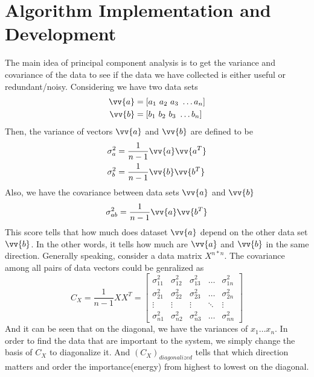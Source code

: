 \documentclass[twoside,twocolumn]{article}
\begin{document}
    \section{Algorithm Implementation and Development}
    The main idea of principal component analysis is to get the variance and covariance of the data to see if
    the data we have collected is either useful or redundant/noisy.
    Considering we have two data sets 
    \begin{align*}
        \vv{a} &= [a_1\ a_2\ a_3\ \dots a_n] \\
        \vv{b} &= [b_1\ b_2\ b_3\ \dots b_n]
    \end{align*}
    Then, the variance of vectors $\vv{a}$ and $\vv{b}$ are defined to be 
    \begin{align*}
        \sigma_a^2 &= \frac{1}{n - 1} \vv{a}\vv{a^T} \\
        \sigma_b^2 &= \frac{1}{n - 1} \vv{b}\vv{b^T} \\
    \end{align*}
    Also, we have the covariance between data sets $\vv{a}$ and $\vv{b}$ 
    \begin{equation*}
        \sigma_{ab}^2 = \frac{1}{n - 1} \vv{a}\vv{b^T}
    \end{equation*}
    This score tells that how much does dataset $\vv{a}$ depend on the other data set $\vv{b}$. In the other 
    words, it tells how much are $\vv{a}$ and $\vv{b}$ in the same direction. Generally speaking, consider a 
    data matrix $X^{n*n}$. The covariance among all pairs of data vectors could be genralized as 
    \begin{equation*}
        C_X = \frac{1}{n - 1} XX^T = 
        \begin{bmatrix}
            \sigma_{11}^2 & \sigma_{12}^2 & \sigma_{13}^2 & \dots  & \sigma_{1n}^2 \\
            \sigma_{21}^2 & \sigma_{22}^2 & \sigma_{23}^2 & \dots  & \sigma_{2n}^2 \\
            \vdots & \vdots & \vdots & \ddots & \vdots \\
            \sigma_{n1}^2 & \sigma_{n2}^2 & \sigma_{n3}^2 & \dots  & \sigma_{nn}^2
        \end{bmatrix}
    \end{equation*}
    And it can be seen that on the diagonal, we have the variances of $x_1 \dots x_n$. In order to find the data
    that are important to the system, we simply change the basis of $C_X$ to diagonalize it. And $(C_X)_{diagonalized}$
    tells that which direction matters and order the importance(energy) from highest to lowest on the diagonal.
\end{document}

